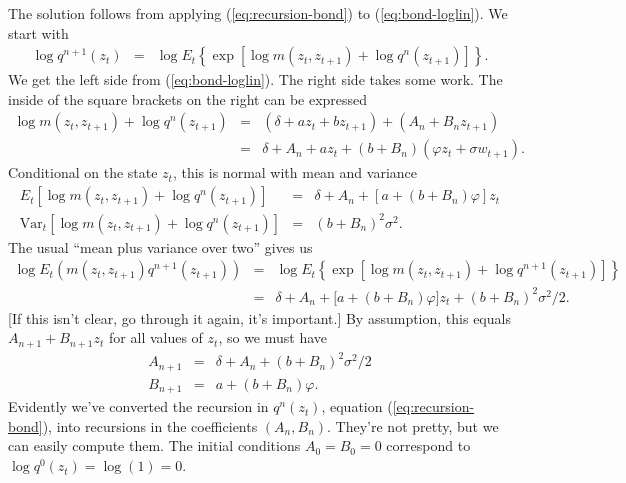 \documentclass[11pt]{article}
\begin{document}
\begin{enumerate}
The solution follows from applying (\ref{eq:recursion-bond}) to (\ref{eq:bond-loglin}).
We start with
\begin{eqnarray*}
    \log q^{n+1} ( z_t )
        &=& \log E_t \left\{
                \exp \left[ \log m(z_t,z_{t+1}) + \log q^{n}(z_{t+1}) \right]
                \right\} .
\end{eqnarray*}
We get the left side from (\ref{eq:bond-loglin}).
The right side takes some work.
The inside of the square brackets on the right can be expressed
\begin{eqnarray*}
    \log m(z_t,z_{t+1}) + \log q^{n}(z_{t+1})
            &=&  (\delta + a z_t + b z_{t+1} ) +  (A_n + B_n z_{t+1} ) \\
            &=& \delta + A_n + a z_t + (b + B_n) (\varphi z_t + \sigma w_{t+1}) .
\end{eqnarray*}
Conditional on the state $z_t$, this is normal with mean and variance
\begin{eqnarray*}
    E_t \left[ \log m(z_t,z_{t+1}) + \log q^{n}(z_{t+1}) \right]
            &=&  \delta + A_n + [a + (b + B_n) \varphi] z_t \\
    \mbox{Var}_t  \left[ \log m(z_t,z_{t+1}) + \log q^{n}(z_{t+1}) \right]
            &=& (b + B_n)^2 \sigma^2 .
\end{eqnarray*}
The usual ``mean plus variance over two'' gives us
\begin{eqnarray*}
        \log E_t \left(  m(z_t,z_{t+1}) q^{n+1}(z_{t+1}) \right)
        &=& \log E_t  \left\{
                \exp \left[ \log m(z_t,z_{t+1}) + \log q^{n+1}(z_{t+1}) \right]
                \right\} \\
        &=&  \delta + A_n + \big[ a + (b + B_n) \varphi \big] z_t  + (b+B_n)^2 \sigma^2/2 .
\end{eqnarray*}
[If this isn't clear, go through it again, it's important.]
By assumption, this equals $ A_{n+1} + B_{n+1} z_t $ for all values of $z_t$,
so we must have
\begin{eqnarray*}
    A_{n+1} &=& \delta + A_n +  (b+B_n)^2 \sigma^2/2  \\
    B_{n+1} &=& a + (b + B_n) \varphi .
\end{eqnarray*}
Evidently we've converted the recursion in $q^n(z_t)$, equation (\ref{eq:recursion-bond}),
into recursions in the coefficients $(A_n , B_n) $.
They're not pretty, but we can easily compute them.
The initial conditions $A_0 = B_0 = 0 $ correspond to $\log q^0(z_t) = \log (1) = 0$.


\begin{comment}
We studied examples earlier in which $z_t$ was one-dimensional
and the bond price was loglinear:  $ \log q^n(z_t) = A_n + B_n z_t$.
The recursions in the bond price functions in these models translate into recursions
in the coefficients $ (A_n,B_n) $.


\end{comment}
\end{enumerate}
\end{document}
